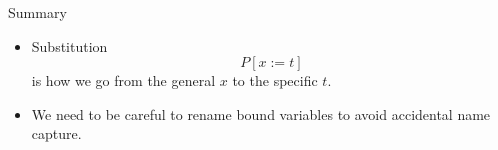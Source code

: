 \documentclass[xetex,aspectratio=169,14pt,hyperref={pdfpagelabels=true,pdflang={en-GB}}]{beamer}
\begin{document}
\begin{frame}
  {Summary}

  \begin{itemize}
  \item Substitution
    \begin{displaymath}
      P [x := t]
    \end{displaymath}
    is how we go from the general $x$ to the specific $t$.
  \item We need to be careful to rename bound variables to avoid
    accidental name capture.
  \end{itemize}
\end{frame}
\end{document}

